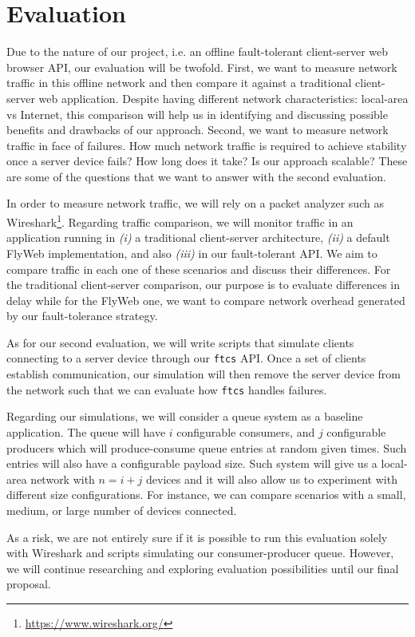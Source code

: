 \section{Evaluation}
\label{sec:evaluation}

Due to the nature of our project, i.e. an offline fault-tolerant client-server web browser API, our evaluation will be twofold. First, we want to measure network traffic in this offline network and then compare it against a traditional client-server web application. Despite having different network characteristics: local-area vs Internet, this comparison will help us in identifying and discussing possible benefits and drawbacks of our approach. Second, we want to measure network traffic in face of failures. How much network traffic is required to achieve stability once a server device fails? How long does it take? Is our approach scalable? These are some of the questions that we want to answer with the second evaluation.

In order to measure network traffic, we will rely on a packet analyzer such as Wireshark\footnote{\url{https://www.wireshark.org/}}. Regarding traffic comparison, we will monitor traffic in an application running in {\it (i)} a traditional client-server architecture, {\it (ii)} a default FlyWeb implementation, and also {\it (iii)} in our fault-tolerant API. We aim to compare traffic in each one of these scenarios and discuss their differences. For the traditional client-server comparison, our purpose is to evaluate differences in delay while for the FlyWeb one, we want to compare network overhead generated by our fault-tolerance strategy. 


As for our second evaluation, we will write scripts that simulate clients connecting to a server device through our \texttt{ftcs} API. Once a set of clients establish communication, our simulation will then remove the server device from the network such that we can evaluate how \texttt{ftcs} handles failures. 


Regarding our simulations, we will consider a queue system as a baseline application. The queue will have $i$ configurable consumers, and $j$ configurable producers which will produce-consume queue entries at random given times. Such entries will also have a configurable payload size.
Such system will give us a local-area network with $n = i + j$ devices and it will also allow us to experiment with different size configurations. For instance, we can compare scenarios with a small, medium, or large number of devices connected.


As a risk, we are not entirely sure if it is possible to run this evaluation solely with Wireshark and scripts simulating our consumer-producer queue. However, we will continue researching and exploring evaluation possibilities until our final proposal.